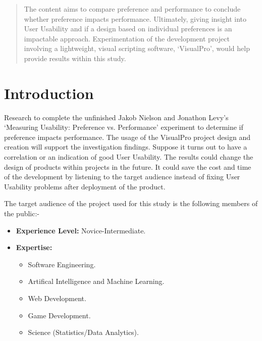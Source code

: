 \documentclass[a0,portrait]{a0poster}
\begin{document}
\begin{multicols}{2} %


\color{ku} %

\begin{abstract}
    The content aims to compare preference and performance to conclude whether preference impacts performance. Ultimately, giving insight into User Usability and if a design based on individual preferences is an impactable approach. Experimentation of the development project involving a lightweight, visual scripting software, `VisualPro', would help provide results within this study.
\end{abstract}


\color{DarkRed} %

\section*{Introduction}
    Research to complete the unfinished Jakob Nielson and Jonathon Levy's `Measuring Usability: Preference vs. Performance' experiment to determine if preference impacts performance. The usage of the VisualPro project design and creation will support the investigation findings. Suppose it turns out to have a correlation or an indication of good User Usability. The results could change the design of products within projects in the future. It could save the cost and time of the development by listening to the target audience instead of fixing User Usability problems after deployment of the product.

    The target audience of the project used for this study is the following members of the public:-
    \begin{itemize}
        \item  \textbf{Experience Level:} Novice-Intermediate.
        \item \textbf{Expertise:}
        \begin{itemize}
            \item Software Engineering.
            \item Artifical Intelligence and Machine Learning.
            \item Web Development.
            \item Game Development.
            \item Science (Statistics/Data Analytics).
        \end{itemize}
    \end{itemize}


\end{multicols}
\end{document}
